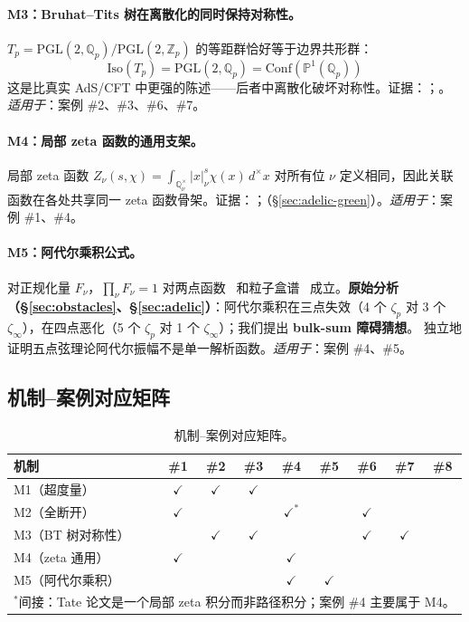 \documentclass[11pt,a4paper]{ctexart}
\theoremstyle{remark}
\newcommand{\Qp}{\mathbb{Q}_p}
\newcommand{\Zp}{\mathbb{Z}_p}
\newcommand{\Pone}{\mathbb{P}^1}
\newcommand{\Tp}{T_p}
\newcommand{\PGL}{\mathrm{PGL}}
\newcommand{\Conf}{\mathrm{Conf}}
\newcommand{\Iso}{\mathrm{Iso}}
\newcommand{\BirTits}{Bruhat--Tits}
\begin{document}
\paragraph{M3：\BirTits{} 树在离散化的同时保持对称性。}
$\Tp = \PGL(2,\Qp)/\PGL(2,\Zp)$ 的等距群恰好等于边界共形群：
\begin{equation}
\Iso(\Tp) = \PGL(2, \Qp) = \Conf(\Pone(\Qp))
\end{equation}
这是比真实 AdS/CFT 中更强的陈述——后者中离散化破坏对称性。证据：\cite{HMSS16}；\cite{P19}。\emph{适用于}：案例 \#2、\#3、\#6、\#7。

\paragraph{M4：局部 zeta 函数的通用支架。}
局部 zeta 函数 $Z_\nu(s, \chi) = \int_{\mathbb{Q}_\nu^\times} |x|_\nu^s \chi(x) \, d^\times x$ 对所有位 $\nu$ 定义相同，因此关联函数在各处共享同一 zeta 函数骨架。证据：\cite{GP17}；\cite{HSYZ20}（\S\ref{sec:adelic-green}）。\emph{适用于}：案例 \#1、\#4。

\paragraph{M5：阿代尔乘积公式。}
对正规化量 $F_\nu$，$\prod_\nu F_\nu = 1$ 对两点函数~\cite{HSYZ20} 和粒子盒谱~\cite{HMS20} 成立。\textbf{原始分析（\S\ref{sec:obstacles}、\S\ref{sec:adelic}）}：阿代尔乘积在三点失效（4 个 $\zeta_p$ 对 3 个 $\zeta_\infty$），在四点恶化（5 个 $\zeta_p$ 对 1 个 $\zeta_\infty$）；我们提出 \textbf{bulk-sum 障碍猜想}。\cite{J22} 独立地证明五点弦理论阿代尔振幅不是单一解析函数。\emph{适用于}：案例 \#4、\#5。

\subsection{机制--案例对应矩阵}
\label{sec:matrix}

\begin{table}[H]
\centering
\caption{机制--案例对应矩阵。}
\label{tab:matrix}
\begin{tabular}{lcccccccc}
\toprule
机制 & \#1 & \#2 & \#3 & \#4 & \#5 & \#6 & \#7 & \#8 \\
\midrule
M1（超度量）             & $\checkmark$ & $\checkmark$ & $\checkmark$ & & & & & \\
M2（全断开）             & $\checkmark$ & & & $\checkmark^{*}$ & & $\checkmark$ & & \\
M3（BT 树对称性）        & & $\checkmark$ & $\checkmark$ & & & $\checkmark$ & $\checkmark$ & \\
M4（zeta 通用）          & $\checkmark$ & & & $\checkmark$ & & & & \\
M5（阿代尔乘积）         & & & & $\checkmark$ & $\checkmark$ & & & \\
\bottomrule
\multicolumn{9}{l}{\footnotesize $^{*}$间接：Tate 论文是一个局部 zeta 积分而非路径积分；案例 \#4 主要属于 M4。}
\end{tabular}
\end{table}
\end{document}
